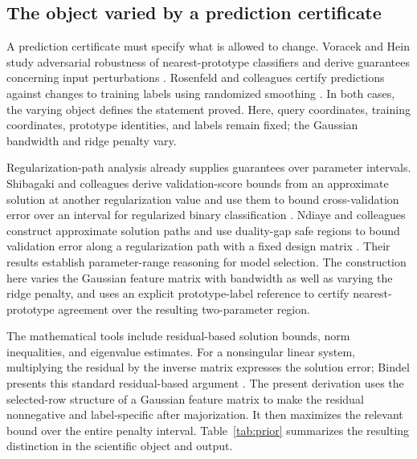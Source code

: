 \documentclass[preprint,12pt]{elsarticle}
\begin{document}
\subsection{The object varied by a prediction certificate}
A prediction certificate must specify what is allowed to change. Voracek and Hein study adversarial robustness of nearest-prototype classifiers and derive guarantees concerning input perturbations \citep{voracek2022}. Rosenfeld and colleagues certify predictions against changes to training labels using randomized smoothing \citep{rosenfeld2020}. In both cases, the varying object defines the statement proved. Here, query coordinates, training coordinates, prototype identities, and labels remain fixed; the Gaussian bandwidth and ridge penalty vary.

Regularization-path analysis already supplies guarantees over parameter intervals. Shibagaki and colleagues derive validation-score bounds from an approximate solution at another regularization value and use them to bound cross-validation error over an interval for regularized binary classification \citep{shibagaki2015}. Ndiaye and colleagues construct approximate solution paths and use duality-gap safe regions to bound validation error along a regularization path with a fixed design matrix \citep{ndiaye2019}. Their results establish parameter-range reasoning for model selection. The construction here varies the Gaussian feature matrix with bandwidth as well as varying the ridge penalty, and uses an explicit prototype-label reference to certify nearest-prototype agreement over the resulting two-parameter region.

The mathematical tools include residual-based solution bounds, norm inequalities, and eigenvalue estimates. For a nonsingular linear system, multiplying the residual by the inverse matrix expresses the solution error; Bindel presents this standard residual-based argument \citep{bindel2025}. The present derivation uses the selected-row structure of a Gaussian feature matrix to make the residual nonnegative and label-specific after majorization. It then maximizes the relevant bound over the entire penalty interval. Table~\ref{tab:prior} summarizes the resulting distinction in the scientific object and output.
\end{document}
